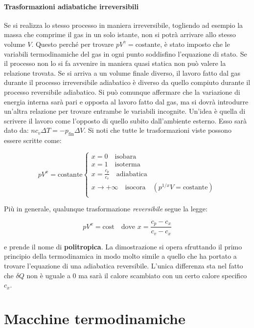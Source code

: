 \paragraph{Trasformazioni adiabatiche irreversibili} Se si realizza lo stesso processo in maniera irreversibile, togliendo ad esempio la massa che comprime il gas in un solo istante, non si potrà arrivare allo stesso volume $V$. Questo perché per trovare $pV^{\gamma}=\text{costante}$, è stato imposto che le variabili termodinamiche del gas in ogni punto soddisfino l'equazione di stato. Se il processo non lo si fa avvenire in maniera quasi statica non può valere la relazione trovata. Se si arriva a un volume finale diverso, il lavoro fatto dal gas durante il processo irreversibile adiabatico è diverso da quello compiuto durante il processo reversibile adiabatico.
Si può comunque affermare che la variazione di energia interna sarà pari e opposta al lavoro fatto dal gas, ma si dovrà introdurre un'altra relazione per trovare entrambe le variabili incognite. Un'idea è quella di scrivere il lavoro come l'opposto di quello subito dall'ambiente esterno. Esso sarà dato da: $nc_v\Delta T = - p_{\text{fin}}\Delta V$.
Si noti che tutte le trasformazioni viste possono essere scritte come:

\[
	pV^x=\text{costante} \left\{ \begin{array}{l}
	 	x = 0 \quad \text{isobara}  \\
	 	x = 1 \quad \text{isoterma}  \\
	 	x = \frac{c_p }{c_v } \quad \text{adiabatica}  \\
	 	x \to +\infty  \quad \text{isocora} \quad (p^{1/x}V=\text{costante}) \\
	\end{array} \right.
\]

Più in generale,  qualunque trasformazione \emph{reversibile} segue la legge:

\[
	\boxed{ pV^x=\text{cost}} \quad \text{dove }x=\frac{c_p-c_x  }{c_v-c_x  }
\]

e prende il nome di \textbf{politropica}. La dimostrazione si opera sfruttando il primo principio della termodinamica in modo molto simile a quello che ha portato a trovare l'equazione di una adiabatica reversibile. L'unica differenza sta nel fatto che $\delta Q$ non è uguale a $0$ ma sarà il calore scambiato con un certo calore specifico $c_x$.

\section{Macchine termodinamiche}

